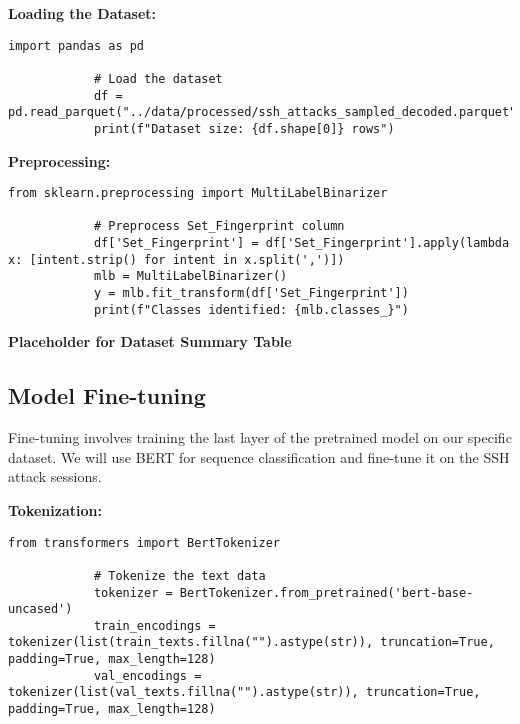         \textbf{Loading the Dataset:}
        
        \vspace{0.5em}

        \begin{lstlisting}[caption={Load dataset and print its size}, label={lst:load_dataset}]
            import pandas as pd

            # Load the dataset
            df = pd.read_parquet("../data/processed/ssh_attacks_sampled_decoded.parquet")
            print(f"Dataset size: {df.shape[0]} rows")
        \end{lstlisting}

        \textbf{Preprocessing:}
        
        \vspace{0.5em}

        \begin{lstlisting}[caption={Preprocess `Set\_Fingerprint` column}, label={lst:preprocess-fingerprint}]
            from sklearn.preprocessing import MultiLabelBinarizer

            # Preprocess Set_Fingerprint column
            df['Set_Fingerprint'] = df['Set_Fingerprint'].apply(lambda x: [intent.strip() for intent in x.split(',')])
            mlb = MultiLabelBinarizer()
            y = mlb.fit_transform(df['Set_Fingerprint'])
            print(f"Classes identified: {mlb.classes_}")
        \end{lstlisting}

        \textbf{Placeholder for Dataset Summary Table}
        
    \subsection{Model Fine-tuning}
    
        Fine-tuning involves training the last layer of the pretrained model on our specific dataset. We will use BERT for sequence classification and fine-tune it on the SSH attack sessions.

        \textbf{Tokenization:}
        
        \vspace{0.5em}

        \begin{lstlisting}[caption={Tokenize text data using BERT tokenizer}, label={lst:bert_tokenizer}]
            from transformers import BertTokenizer

            # Tokenize the text data
            tokenizer = BertTokenizer.from_pretrained('bert-base-uncased')
            train_encodings = tokenizer(list(train_texts.fillna("").astype(str)), truncation=True, padding=True, max_length=128)
            val_encodings = tokenizer(list(val_texts.fillna("").astype(str)), truncation=True, padding=True, max_length=128)
        \end{lstlisting}

